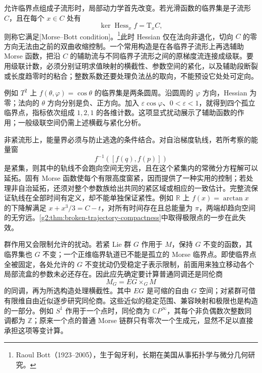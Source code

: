 \ProseParagraphBreak

允许临界点组成子流形时，局部动力学首先改变。若光滑函数的临界集是子流形 \(C\)，且在每个 \(x\in C\) 处有
\[
	\ker\operatorname{Hess}_x f=\mathrm{T}_xC,
\]
则称它满足[Morse--Bott condition]。\footnote{Raoul Bott（1923--2005），生于匈牙利，长期在美国从事拓扑学与微分几何研究。}此时 Hessian 仅在法向非退化，切向 \(C\) 的零方向无法由之前的双曲收缩控制。一个常用构造是在各临界子流形上再选辅助 Morse 函数，把沿 \(C\) 的辅助流与不同临界子流形之间的原梯度流连接成级联。要用级联计数，必须分别证明求值映射的横截性、参数空间的紧化，以及辅助段断裂或长度趋零时的粘合；整数系数还要处理负法丛的取向，不能预设它处处可定向。

\ProseParagraphBreak

例如 \(T^2\) 上 \(f(\theta,\varphi)=\cos\theta\) 的临界集是两条圆周。沿圆周的 \(\varphi\) 方向，Hessian 为零；法向的 \(\theta\) 方向分别是负、正方向。加入 \(\varepsilon\cos\varphi\)、\(0<\varepsilon<1\)，就得到四个孤立临界点，指标依次组成 \(1,2,1\) 的各维计数。这项显式扰动展示了辅助函数的作用；一般级联空间仍需上述横截与紧化分析。

\ProseParagraphBreak

非紧流形上，能量界必须与防止逃逸的条件结合。对自治梯度轨线，若所考察的能量窗
\[
	f^{-1}([f(q),f(p)])
\]
是紧集，则其中的轨线不会跑向空间无穷远，且在这个紧集内的常微分方程解可以延拓。固有 Morse 函数使每个有限高度窗紧，因而提供了一种实用的控制；若处理非自治延拓，还须对整个参数族给出共同的紧区域或相应的一致估计。完整流保证轨线在全部时间有定义，却不能单独保证紧性。例如 \(\mathbb R\) 上 \(f(x)=\arctan x\) 的下降解满足 \(x+x^3/3=C-t\)，对所有时间存在且总能量为 \(\pi\)，两端却趋向空间的无穷远。\cref{g2:thm:broken-trajectory-compactness}中取得极限点的一步在此失效。

\ProseParagraphBreak

群作用又会限制允许的扰动。若紧 Lie 群 \(G\) 作用于 \(M\)，保持 \(G\) 不变的函数，其临界集也 \(G\) 不变；一个正维临界轨道已不能是孤立的 Morse 临界点。即使临界点全被固定，各处允许的 \(G\) 不变扰动仍受稳定子表示限制，前面用来独立移动各个局部流盒的参数未必还存在。因此应先确定要计算普通同调还是同伦商
\[
	M_G=EG\times_GM
\]
的同调，再为所选构造处理横截性。其中 \(EG\) 是可缩的自由 \(G\) 空间；对紧群可借有限维自由近似逐步研究同伦商。这些近似的稳定范围、兼容映射和极限也是构造的一部分。例如 \(S^1\) 作用于一个点时，同伦商为 \(\mathbb CP^\infty\)，其每个非负偶数次整数同调都为 \(\mathbb Z\)；原来一个点的普通 Morse 链群只有零次一个生成元，显然不足以直接承担这项等变计算。
